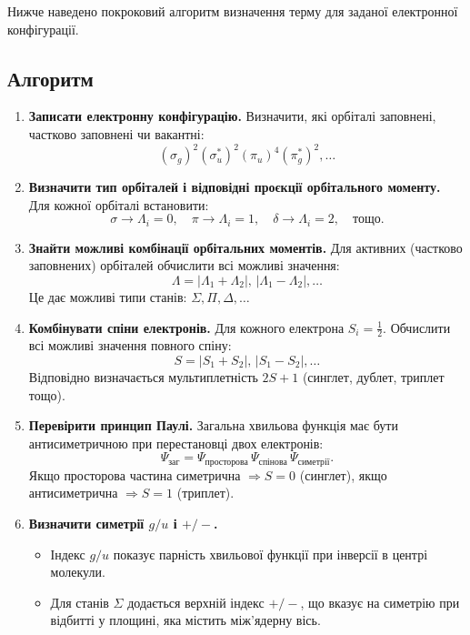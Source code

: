 \bigskip
Нижче наведено покроковий алгоритм визначення терму для заданої електронної конфігурації.

\subsection*{Алгоритм}

\begin{enumerate}
  \item \textbf{Записати електронну конфігурацію.}
  Визначити, які орбіталі заповнені, частково заповнені чи вакантні:
  \[
  (\sigma_g)^2(\sigma_u^*)^2(\pi_u)^4(\pi_g^*)^2, \ldots
  \]

  \item \textbf{Визначити тип орбіталей і відповідні проєкції орбітального моменту.}
  Для кожної орбіталі встановити:
  \[
  \sigma \rightarrow \Lambda_i = 0, \quad
  \pi \rightarrow \Lambda_i = 1, \quad
  \delta \rightarrow \Lambda_i = 2, \quad
  \text{тощо.}
  \]

  \item \textbf{Знайти можливі комбінації орбітальних моментів.}
  Для активних (частково заповнених) орбіталей обчислити всі можливі значення:
  \[
  \Lambda = |\Lambda_1 + \Lambda_2|,\, |\Lambda_1 - \Lambda_2|, \ldots
  \]
  Це дає можливі типи станів: $\Sigma, \Pi, \Delta, \ldots$

  \item \textbf{Комбінувати спіни електронів.}
  Для кожного електрона $S_i = \tfrac{1}{2}$.
  Обчислити всі можливі значення повного спіну:
  \[
  S = |S_1 + S_2|,\, |S_1 - S_2|, \ldots
  \]
  Відповідно визначається мультиплетність $2S+1$ (синглет, дублет, триплет тощо).

  \item \textbf{Перевірити принцип Паулі.}
  Загальна хвильова функція має бути антисиметричною при перестановці двох електронів:
  \[
  \Psi_{\text{заг}} = \Psi_{\text{просторова}} \, \Psi_{\text{спінова}} \, \Psi_{\text{симетрії}}.
  \]
  Якщо просторова частина симетрична $\Rightarrow S=0$ (синглет),
  якщо антисиметрична $\Rightarrow S=1$ (триплет).

  \item \textbf{Визначити симетрії $g/u$ і $+/-$.}
  \begin{itemize}
    \item Індекс $g/u$ показує парність хвильової функції при інверсії в центрі молекули.
    \item Для станів $\Sigma$ додається верхній індекс $+/-$, що вказує на симетрію при відбитті у площині, яка містить між’ядерну вісь.
  \end{itemize}


\end{enumerate}
